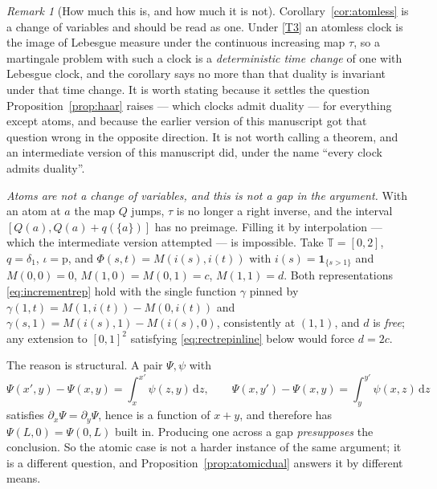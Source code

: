 \documentclass[11pt,a4paper]{article}
\theoremstyle{plain}
\theoremstyle{definition}
\theoremstyle{remark}
\newtheorem{remark}[theorem]{Remark}
\newcommand{\T}{\mathbb{T}}                     %
\newcommand{\one}{\mathbf{1}}
\newcommand{\dif}{\,\mathrm{d}}
\begin{document}
\begin{remark}[How much this is, and how much it is not]
  \label{rem:atomsnotchange}
  Corollary~\ref{cor:atomless} is a change of variables and should be read as
  one.  Under \eqref{T3} an atomless clock is the image of Lebesgue measure under the
  continuous increasing map $\tau$, so a martingale problem with such a clock is
  a \emph{deterministic time change} of one with Lebesgue clock, and the
  corollary says no more than that duality is invariant under that time change.
  It is worth stating because it settles the question
  Proposition~\ref{prop:haar} raises --- which clocks admit duality --- for
  everything except atoms, and because the earlier version of this manuscript got
  that question wrong in the opposite direction.  It is not worth calling a
  theorem, and an intermediate version of this manuscript did, under the name
  ``every clock admits duality''.

  \emph{Atoms are not a change of variables, and this is not a gap in the
  argument.}  With an atom at $a$ the map $Q$ jumps, $\tau$ is no longer a right
  inverse, and the interval $[Q(a),Q(a)+q(\{a\})]$ has no preimage.  Filling it
  by interpolation --- which the intermediate version attempted --- is impossible.
  Take $\T = [0,2]$, $q = \delta_1$, $\iota = \mathrm{p}$, and
  $\Phi(s,t) = M(i(s),i(t))$ with $i(s) = \one_{\{s>1\}}$ and $M(0,0) = 0$,
  $M(1,0) = M(0,1) = c$, $M(1,1) = d$.  Both representations
  \eqref{eq:incrementrep} hold with the single function $\gamma$ pinned by
  $\gamma(1,t) = M(1,i(t)) - M(0,i(t))$ and
  $\gamma(s,1) = M(i(s),1) - M(i(s),0)$, consistently at $(1,1)$, and $d$ is
  \emph{free}; any extension to $[0,1]^2$ satisfying \eqref{eq:rectrepinline}
  below would force $d = 2c$.

  The reason is structural.  A pair $\Psi,\psi$ with
  \begin{equation}
    \label{eq:rectrepinline}
    \Psi(x',y) - \Psi(x,y) = \int_x^{x'} \!\psi(z,y)\dif z ,
    \qquad
    \Psi(x,y') - \Psi(x,y) = \int_y^{y'} \!\psi(x,z)\dif z
  \end{equation}
  satisfies $\partial_x\Psi = \partial_y\Psi$, hence is a function of $x+y$, and
  therefore has $\Psi(L,0) = \Psi(0,L)$ built in.  Producing one across a gap
  \emph{presupposes} the conclusion.  So the atomic case is not a harder instance
  of the same argument; it is a different question, and
  Proposition~\ref{prop:atomicdual} answers it by different means.


\end{remark}
\end{document}
